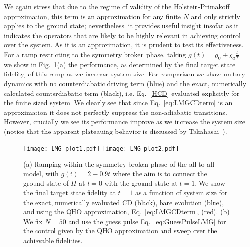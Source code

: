 We again stress that due to the regime of validity of the Holstein-Primakoff approximation, this term is an approximation for any finite $N$ and only strictly applies to the ground state; nevertheless, it provides useful insight insofar as it indicates the operators that are likely to be highly relevant in achieving control over the system. As it is an approximation, it is prudent to test its effectiveness. For a ramp restricting to the symmetry broken phase, taking $g(t)=g_0+g_d \frac{t}{T}$ we show in Fig.~\ref{LMGfig}(a) the performance, as determined by the final target state fidelity, of this ramp as we increase system size. For comparison we show unitary dynamics with no counterdiabatic driving term (blue) and the exact, numerically calculated counterdiabatic term (black), i.e. Eq.~\eqref{HCD} evaluated explicitly for the finite sized system. We clearly see that since Eq.~\eqref{eq:LMGCDterm} is an approximation it does not perfectly suppress the non-adiabatic transitions. However, crucially we see its performance improve as we increase the system size (notice that the apparent plateauing behavior is discussed by Takahashi~\cite{TakahashiPRE}). 

\begin{figure}[t]
\texttt{[image: LMG\_plot1.pdf]}
\texttt{[image: LMG\_plot2.pdf]}
\caption{(a) Ramping within the symmetry broken phase of the all-to-all model, with $g(t)=2-0.9 t$ where the aim is to connect the ground state of $H$ at $t=0$ with the ground state at $t=1$. We show the final target state fidelity at $t=1$ as a function of system size for the exact, numerically evaluated CD (black), bare evolution (blue), and using the QHO approximation, Eq.~\eqref{eq:LMGCDterm}, (red). (b) We fix $N=50$ and use the guess pulse Eq.~\eqref{eq:GuessPulseLMG} for the control given by the QHO approximation and sweep over the achievable fidelities.}
\label{LMGfig}
\end{figure}

